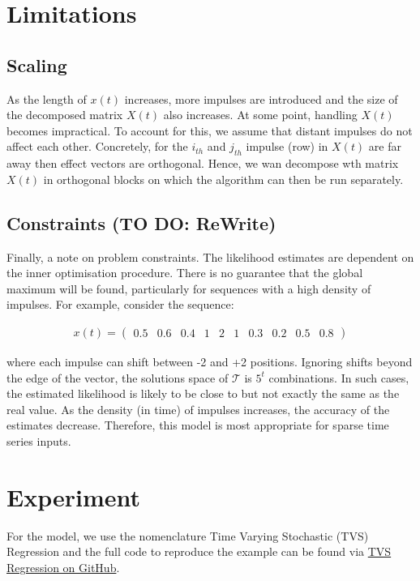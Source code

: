 \documentclass[11pt]{amsart}
\theoremstyle{definition}
\theoremstyle{definition}
\begin{document}
\section{Limitations}
\subsection{Scaling}
As the length of $x(t)$ increases, more impulses are introduced and the size of the decomposed matrix $X(t)$ also increases. At some point, handling $X(t)$ becomes impractical. To account for this, we assume that distant impulses do not affect each other. Concretely, for the $i_{th}$ and $j_{th}$ impulse (row) in $X(t)$ are far away then effect vectors are orthogonal. Hence, we wan decompose wth matrix $X(t)$ in orthogonal blocks on which the algorithm can then be run separately.

\subsection{Constraints (TO DO: ReWrite)}
Finally, a note on problem constraints. The likelihood estimates are dependent on the inner optimisation procedure. There is no guarantee that the global maximum will be found, particularly for sequences with a high density of impulses. For example, consider the sequence:

\begin{align*}
    x(t) = 
    \left(
\begin{array}{cccccccccc}
    0.5 & 0.6 & 0.4 & 1 & 2 & 1 &
    0.3 & 0.2 & 0.5 & 0.8 
\end{array}  
\right)
\end{align*}

where each impulse can shift between -2 and +2 positions. Ignoring shifts beyond the edge of the vector, the solutions space of $\mathcal{T}$ is $5^t$ combinations.  
In such cases, the estimated likelihood is likely to be close to but not exactly the same as the real value. As the density (in time) of impulses increases, the accuracy of the estimates decrease. Therefore, this model is most appropriate for sparse time series inputs.

\section{Experiment}

For the model, we use the nomenclature Time Varying Stochastic (TVS) Regression and the full code to reproduce the example can be found via \href{https://github.com/aaron1rcl/tvs_regression/}{TVS Regression on GitHub}.
\end{document}
